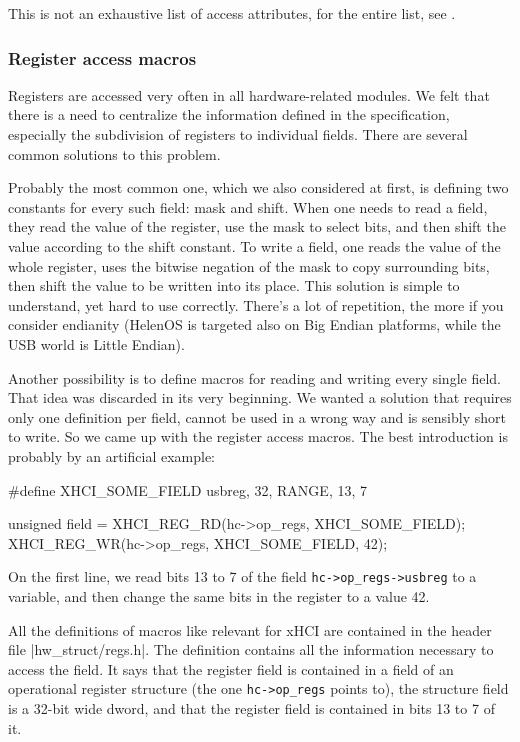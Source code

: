 This is not an exhaustive list of access attributes, for the entire list, see .

\subsubsection{Register access macros}

Registers are accessed very often in all hardware-related modules. We felt that
there is a need to centralize the information defined in the specification,
especially the subdivision of registers to individual fields. There are several
common solutions to this problem.

Probably the most common one, which we also considered at first, is defining
two constants for every such field: mask and shift. When one needs to read
a field, they read the value of the register, use the mask to select bits, and
then shift the value according to the shift constant. To write a field, one reads
the value of the whole register, uses the bitwise negation of the mask to copy
surrounding bits, then shift the value to be written into its place. This
solution is simple to understand, yet hard to use correctly. There's a lot of
repetition, the more if you consider endianity (HelenOS is targeted also on Big
Endian platforms, while the USB world is Little Endian).

Another possibility is to define macros for reading and writing every single
field. That idea was discarded in its very beginning. We wanted a solution
that requires only one definition per field, cannot be used in a wrong way and
is sensibly short to write. So we came up with the register access macros. The
best introduction is probably by an artificial example:

\begin{listing}[h]
\begin{code}
#define XHCI_SOME_FIELD            usbreg, 32, RANGE, 13, 7

unsigned field = XHCI_REG_RD(hc->op_regs, XHCI_SOME_FIELD);
XHCI_REG_WR(hc->op_regs, XHCI_SOME_FIELD, 42);
\end{code}
	\caption[An example of using register macros]{On the first line, we read
	bits 13 to 7 of the field \texttt{hc->op_regs->usbreg} to
	a variable, and then change the same bits in the register to a value 42.}
\end{listing}

All the definitions of macros like  relevant for xHCI
are contained in the header file \header|hw_struct/regs.h|. The definition
contains all the information necessary to access the field. It says that the
register field is contained in a field  of an operational
register structure (the one \texttt{hc->op_regs} points to), the
structure field is a 32-bit wide dword, and that the register field is
contained in bits 13 to 7 of it.

